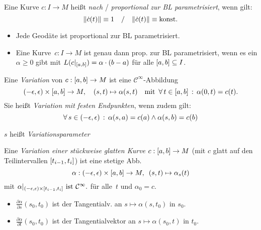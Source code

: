 \documentclass{cheat-sheet}
\newcommand{\vinterval}{\ointerval{-\epsilon}{\epsilon}} %
\newcommand{\abinterval}{\cinterval{a}{b}} %
\newcommand{\Cont}{\mathcal{C}} %
\begin{document}
\begin{defn}
  Eine Kurve $c : I \to M$ heißt \emph{nach} / \emph{proportional zur BL parametrisiert}, wenn gilt:
  \[
    \lVert\dot{c}(t)\rVert \equiv 1
    \quad / \quad
    \lVert\dot{c}(t)\rVert \equiv \text{konst}.
  \]
\end{defn}

\begin{bem}
  \begin{itemize}
    \item Jede Geodäte ist proportional zur BL parametrisiert.
    \item Eine Kurve~$c : I \to M$ ist genau dann prop. zur BL parametrisiert, wenn es ein $\alpha \geq 0$ gibt mit $L(c|_{\abinterval}) = \alpha \cdot (b - a)$ für alle $\left[ a, b \right] \subseteq I$.
  \end{itemize}
\end{bem}

\begin{defn}
  Eine \emph{Variation} von $c : \abinterval \to M$ ist eine $\Cont^\infty$-Abbildung
  \[
    \vinterval \times \abinterval \to M, \quad
    (s, t) \mapsto \alpha(s, t)
    \quad \text{mit} \enspace
    \fa{t \in \abinterval} \alpha(0, t) = c(t).
  \]
  Sie heißt \emph{Variation mit festen Endpunkten}, wenn zudem gilt:
  \[
    \fa{s \in \vinterval}
    \alpha(s, a) = c(a) \wedge \alpha(s, b) = c(b)
  \]
\end{defn}

\begin{sprech}
  $s$ heißt \textit{Variationsparameter}
\end{sprech}

\begin{defn}
  Eine \textit{Variation einer stückweise glatten Kurve} $c : \abinterval \to M$ (mit $c$ glatt auf den Teilintervallen $\left[ t_{i-1}, t_i \right]$) ist eine stetige Abb.
  \[
    \alpha : \vinterval \times \abinterval \to M,
    \enspace (s, t) \mapsto \alpha_s(t)
  \]
  mit
  $
    \alpha|_{\vinterval \times \cinterval{t_{i-1}}{t_i}} \text{ ist } \Cont^\infty.
  $
  für alle~$t$ und $\alpha_0 = c$.
\end{defn}

\begin{nota}
  \begin{itemize}
    \item $\tfrac{\partial \alpha}{\partial s} (s_0, t_0)$ ist der Tangentialv. an $s \mapsto \alpha(s, t_0)$ in $s_0$.
    \item $\tfrac{\partial \alpha}{\partial t} (s_0, t_0)$ ist der Tangentialvektor an $s \mapsto \alpha(s_0, t)$ in $t_0$.
  \end{itemize}
\end{nota}
\end{document}
